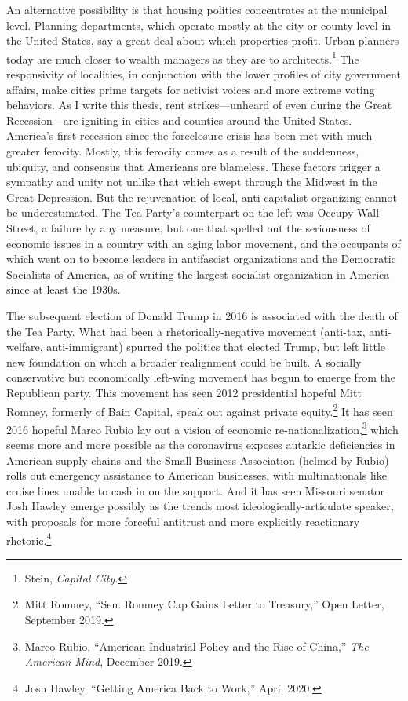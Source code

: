 \documentclass[12pt,oneside]{psthesis}
\begin{document}
An alternative possibility is that housing politics concentrates at the municipal level.
Planning departments, which operate mostly at the city or county level in the United States, say a great deal about which properties profit.
Urban planners today are much closer to wealth managers as they are to architects.\footnote{Stein, \emph{Capital City}.}
The responsivity of localities, in conjunction with the lower profiles of city government affairs, make cities prime targets for activist voices and more extreme voting behaviors.
As I write this thesis, rent strikes---unheard of even during the Great Recession---are igniting in cities and counties around the United States.
America's first recession since the foreclosure crisis has been met with much greater ferocity.
Mostly, this ferocity comes as a result of the suddenness, ubiquity, and consensus that Americans are blameless.
These factors trigger a sympathy and unity not unlike that which swept through the Midwest in the Great Depression.
But the rejuvenation of local, anti-capitalist organizing cannot be underestimated.
The Tea Party's counterpart on the left was Occupy Wall Street, a failure by any measure, but one that spelled out the seriousness of economic issues in a country with an aging labor movement, and the occupants of which went on to become leaders in antifascist organizations and the Democratic Socialists of America, as of writing the largest socialist organization in America since at least the 1930s.

The subsequent election of Donald Trump in 2016 is associated with the death of the Tea Party.
What had been a rhetorically-negative movement (anti-tax, anti-welfare, anti-immigrant) spurred the politics that elected Trump, but left little new foundation on which a broader realignment could be built.
A socially conservative but economically left-wing movement has begun to emerge from the Republican party.
This movement has seen 2012 presidential hopeful Mitt Romney, formerly of Bain Capital, speak out against private equity.\footnote{Mitt Romney, ``Sen. Romney Cap Gains Letter to Treasury,'' Open Letter, September 2019.}
It has seen 2016 hopeful Marco Rubio lay out a vision of economic re-nationalization,\footnote{Marco Rubio, ``American Industrial Policy and the Rise of China,'' \emph{The American Mind}, December 2019.} which seems more and more possible as the coronavirus exposes autarkic deficiencies in American supply chains and the Small Business Association (helmed by Rubio) rolls out emergency assistance to American businesses, with multinationals like cruise lines unable to cash in on the support.
And it has seen Missouri senator Josh Hawley emerge possibly as the trends most ideologically-articulate speaker, with proposals for more forceful antitrust and more explicitly reactionary rhetoric.\footnote{Josh Hawley, ``Getting America Back to Work,'' April 2020.}
\end{document}
